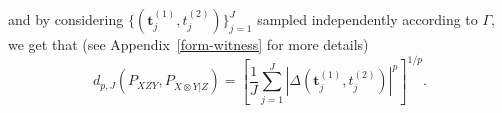 and by considering $\{(\mathbf{t}^{(1)}_j,t^{(2)}_j)\}_{j=1}^J$ sampled independently according to $\Gamma$, we get that (see Appendix~\ref{form-witness} for more details)
$$ d_{p,J} (P_{XZY},P_{\ddot{X}\otimes Y|Z})=\left[\frac{1}{J}\sum_{j=1}^J \left|\Delta(\mathbf{t}^{(1)}_j,t^{(2)}_j)\right|^p\right]^{1/p}.$$


